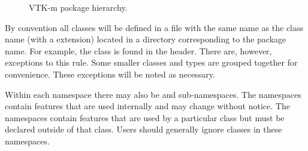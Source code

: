 \begin{figure}
  \centering
  \caption{VTK-m package hierarchy.}
  \label{fig:Packages}
\end{figure}

By convention all classes will be defined in a file with the same name as
the class name (with a  extension) located in a directory
corresponding to the package name. For example, the 
class is found in the  header. There
are, however, exceptions to this rule. Some smaller classes and types are
grouped together for convenience. These exceptions will be noted as
necessary.

Within each namespace there may also
be 
and 
sub-namespaces. The  namespaces contain features
that are used internally and may change without
notice. The  namespaces contain features that are
used by a particular class but must be declared outside of that
class. Users should generally ignore classes in these namespaces.

